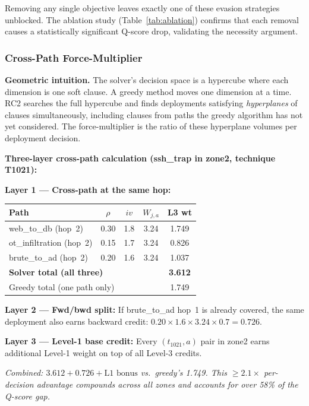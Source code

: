 \documentclass[journal]{IEEEtran}
\begin{document}
Removing any single objective leaves exactly one of these
evasion strategies unblocked.
The ablation study (Table~\ref{tab:ablation}) confirms
that each removal causes a statistically significant Q-score
drop, validating the necessity argument.

\subsubsection{Cross-Path Force-Multiplier}
\label{subsec:crosspath}

\begin{insightbox}
\textbf{Geometric intuition.}
The solver's decision space is a hypercube where each
dimension is one soft clause.
A greedy method moves one dimension at a time.
RC2 searches the full hypercube and finds deployments
satisfying \emph{hyperplanes} of clauses simultaneously,
including clauses from paths the greedy algorithm has not
yet considered.
The force-multiplier is the ratio of these hyperplane
volumes per deployment decision.
\end{insightbox}

\begin{examplebox}
\textbf{Three-layer cross-path calculation (ssh\_trap in
zone2, technique T1021):}

\smallskip\noindent\textbf{Layer 1 --- Cross-path at the
same hop:}
\begin{center}
\small\renewcommand{\arraystretch}{1.15}
\begin{tabular}{@{}lcccc@{}}
\toprule
\textbf{Path}&$\rho$&$iv$&$W_{j,a}$&\textbf{L3 wt}\\
\midrule
web\_to\_db (hop~2)     &0.30&1.8&3.24&1.749\\
ot\_infiltration (hop~2)&0.15&1.7&3.24&0.826\\
brute\_to\_ad (hop~2)   &0.20&1.6&3.24&1.037\\
\midrule
\multicolumn{4}{l}{\textbf{Solver total (all three)}}&\textbf{3.612}\\
\multicolumn{4}{l}{Greedy total (one path only)}&1.749\\
\bottomrule
\end{tabular}
\end{center}

\noindent\textbf{Layer 2 --- Fwd/bwd split:}
If brute\_to\_ad hop~1 is already covered, the same
deployment also earns backward credit:
$0.20\times1.6\times3.24\times0.7=\mathbf{0.726}$.

\noindent\textbf{Layer 3 --- Level-1 base credit:}
Every $(t_{1021},a)$ pair in zone2 earns additional
Level-1 weight on top of all Level-3 credits.

\textit{Combined: $3.612+0.726+\text{L1~bonus}$ vs.\
greedy's 1.749. This $\geq2.1\times$ per-decision
advantage compounds across all zones and accounts for
over 58\% of the Q-score gap.}
\end{examplebox}
\end{document}
